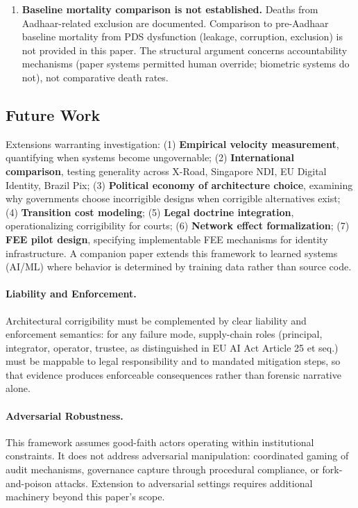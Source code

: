 \documentclass{article}
\begin{document}
\begin{enumerate}
    \item \textbf{Baseline mortality comparison is not established.} Deaths from Aadhaar-related exclusion are documented. Comparison to pre-Aadhaar baseline mortality from PDS dysfunction (leakage, corruption, exclusion) is not provided in this paper. The structural argument concerns accountability mechanisms (paper systems permitted human override; biometric systems do not), not comparative death rates.
\end{enumerate}

\subsection{Future Work}

Extensions warranting investigation: (1) \textbf{Empirical velocity measurement}, quantifying when systems become ungovernable; (2) \textbf{International comparison}, testing generality across X-Road, Singapore NDI, EU Digital Identity, Brazil Pix; (3) \textbf{Political economy of architecture choice}, examining why governments choose incorrigible designs when corrigible alternatives exist; (4) \textbf{Transition cost modeling}; (5) \textbf{Legal doctrine integration}, operationalizing corrigibility for courts; (6) \textbf{Network effect formalization}; (7) \textbf{FEE pilot design}, specifying implementable FEE mechanisms for identity infrastructure. A companion paper extends this framework to learned systems (AI/ML) where behavior is determined by training data rather than source code.

\paragraph{Liability and Enforcement.} Architectural corrigibility must be complemented by clear liability and enforcement semantics: for any failure mode, supply-chain roles (principal, integrator, operator, trustee, as distinguished in EU AI Act Article 25 et seq.) must be mappable to legal responsibility and to mandated mitigation steps, so that evidence produces enforceable consequences rather than forensic narrative alone.

\paragraph{Adversarial Robustness.} This framework assumes good-faith actors operating within institutional constraints. It does not address adversarial manipulation: coordinated gaming of audit mechanisms, governance capture through procedural compliance, or fork-and-poison attacks. Extension to adversarial settings requires additional machinery beyond this paper's scope.
\end{document}
